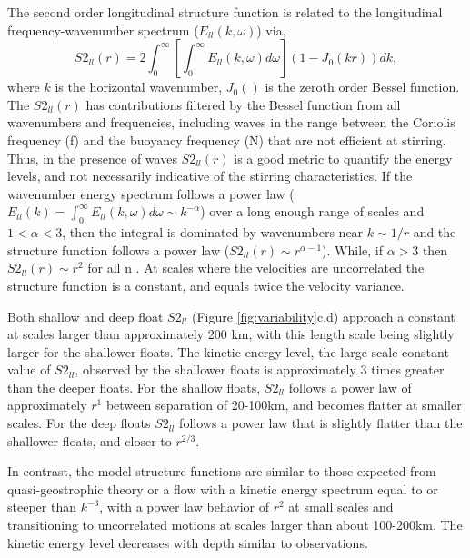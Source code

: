 \documentclass[]{ametsoc}
\begin{document}
The second order longitudinal structure function is related to the longitudinal frequency-wavenumber spectrum ($E_{ll}(k, \omega)$) via, 
\begin{equation}
    S2_{ll}(r) = 2\int_0^\infty \left[ \int_0^\infty E_{ll}(k, \omega) d\omega \right] (1- J_0(kr)) dk, 
    \label{eqn:S2}
\end{equation}
where $k$ is the horizontal wavenumber, $J_0()$ is the zeroth order Bessel function. The $S2_{ll}(r)$ has contributions filtered by the Bessel function from all wavenumbers and frequencies, including waves in the range between the Coriolis frequency (f) and the buoyancy frequency (N) that are not efficient at stirring. Thus, in the presence of waves $S2_{ll}(r)$ is a good metric to quantify the energy levels, and not necessarily indicative of the stirring characteristics. If the wavenumber energy spectrum follows a power law ($E_{ll}(k) = \int_0^\infty E_{ll}(k, \omega) d\omega \sim k^{-\alpha}$) over a long enough range of scales and $1<\alpha<3$, then the integral is dominated by wavenumbers near $k \sim 1/r$  and the structure function follows a power law ($S2_{ll}(r)\sim r^{\alpha-1}$). While, if $\alpha>3$ then $S2_{ll}(r)\sim r^{2}$ for all n \citep{bennett1984relative, balwada2016b}. At scales where the velocities are uncorrelated the structure function is a constant, and equals twice the velocity variance.

Both shallow and deep float $S2_{ll}$ (Figure \ref{fig:variability}c,d) approach a constant at scales larger than approximately 200 km, with this length scale being slightly larger for the shallower floats. The kinetic energy level, the large scale constant value of $S2_{ll}$, observed by the shallower floats is approximately 3 times greater than the deeper floats. For the shallow floats, $S2_{ll}$ follows a power law of approximately $r^1$ between separation of 20-100km, and becomes flatter at smaller scales. For the deep floats $S2_{ll}$ follows a power law that is slightly flatter than the shallower floats, and closer to $r^{2/3}$. 

In contrast, the model structure functions are similar to those expected from quasi-geostrophic theory or a flow with a kinetic energy spectrum equal to or steeper than $k^{-3}$, with a power law behavior of $r^{2}$ at small scales and transitioning to uncorrelated motions at scales larger than about 100-200km. The kinetic energy level decreases with depth similar to observations.
\end{document}
